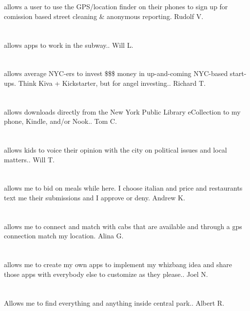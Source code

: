 \section{}allows a user to use the GPS/location finder on their phones to sign up for comission based street cleaning \& anonymous reporting. Rudolf V.
\section{}allows apps to work in the subway.. Will L.
\section{}allows average NYC-ers to invest \$\$\$ money in up-and-coming NYC-based start-ups. Think Kiva + Kickstarter,  but for angel investing.. Richard T.
\section{}allows downloads directly from the New York Public Library eCollection to my phone,  Kindle,  and/or Nook.. Tom C.
\section{} allows kids to voice their opinion with the city on political issues and local matters.. Will T.
\section{}allows me to bid on meals while here.  I choose italian and price and restaurants text me their submissions and I approve or deny. Andrew K.
\section{}allows me to connect and match with cabs that are available and through a gps connection match my location. Alina G.
\section{}allows me to create my own apps to implement my whizbang idea and share those apps with everybody else to customize as they please.. Joel N.
\section{} Allows me to find everything and anything inside central park.. Albert R.

